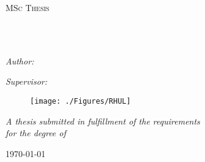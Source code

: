 \documentclass[
11pt, %
english, %
singlespacing, %
headsepline, %
]{MastersDoctoralThesis} %
\author{Fran\c{c}ois \textsc{Berrier}} %
\begin{document}
\frontmatter %

\pagestyle{plain} %


\begin{titlepage}
\begin{center}

\vspace*{.06\textheight}
{\scshape\LARGE \univname\par}\vspace{1cm} %
\textsc{\Large MSc Thesis}\\[0.5cm] %

\HRule \\[0.4cm] %
{\huge \bfseries \ttitle\par}\vspace{0.4cm} %
\HRule \\[1.5cm] %
 
\begin{minipage}[t]{0.4\textwidth}
\begin{flushleft} \large
\emph{Author:}\\
\href{francois.berrier@cantab.net}{\authorname} %
\end{flushleft}
\end{minipage}
\begin{minipage}[t]{0.5\textwidth}
\begin{flushright} \large
\emph{Supervisor:} \\
\href{https://www.cs.rhul.ac.uk/~chrisw/}{\supname} %
\end{flushright}
\end{minipage}
 
\vfill

\begin{figure}[H]
\centering
\texttt{[image: ./Figures/RHUL]}
\end{figure}
\large \textit{A thesis submitted in fulfillment of the requirements\\ for the degree of \degreename}\\[0.3cm] %
 
\vfill

{\large \today}\\[4cm] %
 
\vfill
\end{center}
\end{titlepage}
\end{document}
